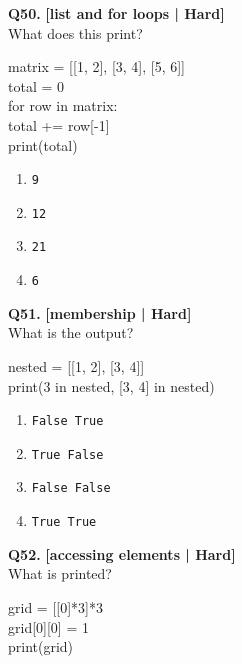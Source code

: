 \noindent\textbf{Q50.} \hfill {\small\color{LPUOrange}\textbf{[list and for loops | Hard]}}\\[2pt]
What does this print? 

\begin{pycode}
matrix = [[1, 2], [3, 4], [5, 6]]\\
total = 0\\
for row in matrix:\\
total += row[-1]\\
print(total)
\end{pycode}

\begin{enumerate}[label=(\alph*),topsep=2pt,itemsep=1pt,partopsep=0pt,parsep=0pt]
    \item \relax \texttt{9}
    \item \relax \texttt{12}
    \item \relax \texttt{21}
    \item \relax \texttt{6}
\end{enumerate}
\vspace{2mm}

\noindent\textbf{Q51.} \hfill {\small\color{LPUOrange}\textbf{[membership | Hard]}}\\[2pt]
What is the output? 

\begin{pycode}
nested = [[1, 2], [3, 4]]\\
print(3 in nested, [3, 4] in nested)
\end{pycode}

\begin{enumerate}[label=(\alph*),topsep=2pt,itemsep=1pt,partopsep=0pt,parsep=0pt]
    \item \relax \texttt{False True}
    \item \relax \texttt{True False}
    \item \relax \texttt{False False}
    \item \relax \texttt{True True}
\end{enumerate}
\vspace{2mm}

\noindent\textbf{Q52.} \hfill {\small\color{LPUOrange}\textbf{[accessing elements | Hard]}}\\[2pt]
What is printed? 

\begin{pycode}
grid = [[0]*3]*3\\
grid[0][0] = 1\\
print(grid)
\end{pycode}

